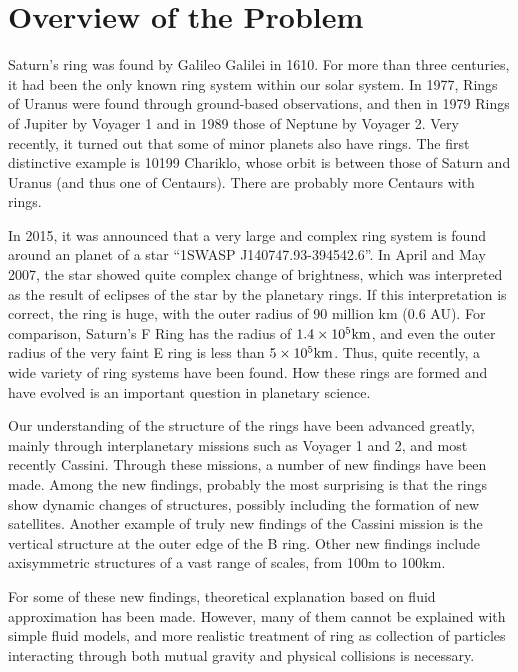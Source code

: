 \documentclass[sigconf]{acmart}
\begin{document}
  \section{Overview of the Problem}
  \label{sect:overview}


Saturn's ring was found by Galileo Galilei in 1610. For more than
three centuries, it had been the only known ring system within our
solar system. In 1977, Rings of Uranus were found through ground-based
observations, and then in 1979 Rings of Jupiter by Voyager 1 and in
1989 those of Neptune by Voyager 2.  Very recently, it turned out that
some of minor planets also have rings. The first distinctive example
is 10199 Chariklo, whose orbit is between those of Saturn and Uranus
(and thus one of Centaurs). There are probably  more Centaurs with rings.

In 2015, it was announced that a very large and complex ring system is
found around an planet of a star ``1SWASP J140747.93-394542.6''. In 
April and May 2007, the star showed quite complex change of
brightness, which was interpreted  as the result of eclipses of the
star by the planetary rings. If this interpretation is correct, the
ring is huge, with the outer radius of 90 million km (0.6 AU). For
comparison, Saturn's F Ring has the radius of $1.4\times 10^5{\rm
  km}$, and even the outer radius of the very faint E ring is less
than $5\times 10^5{\rm km}$. 
Thus, quite recently, a wide variety of ring systems have been found.
How these rings are formed and have evolved is an important question
in planetary science.

Our understanding of the structure of the rings have been advanced
greatly, mainly through interplanetary missions such as Voyager 1 and
2, and most recently Cassini. Through these missions, a number of new
findings have been made. Among the new findings, probably the most
surprising is that the rings show dynamic changes of structures,
possibly including the formation of new satellites. Another example of
truly new findings of the Cassini mission is the vertical structure at
the outer edge of the B ring.  Other new findings include axisymmetric
structures of a vast range of scales, from 100m to 100km.

For some of these new findings, theoretical explanation based on fluid
approximation has been made. However, many of them cannot be explained
with simple fluid models, and more realistic treatment of ring as
collection of particles interacting through both mutual gravity and
physical collisions is necessary. 
\end{document}
